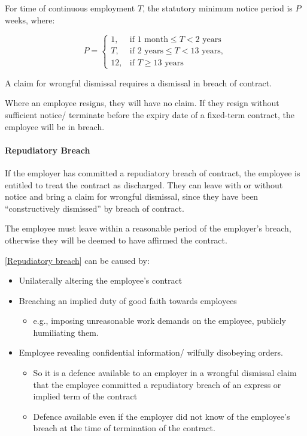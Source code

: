 \documentclass[
]{article}
\providecommand{\tightlist}{%
  \setlength{\itemsep}{0pt}\setlength{\parskip}{0pt}}
\begin{document}
For time of continuous employment \(T\), the statutory minimum notice
period is \(P\) weeks, where:

\[P = \begin{cases}  
1 , & \text{if } 1 \text{ month} \leq T < 2 \text{ years}\\  
T , & \text{if } 2 \text{ years} \leq T < 13 \text{ years},\\  
12, & \text{if } T \geq 13 \text{ years}  
\end{cases}  
\]

A claim for wrongful dismissal requires a dismissal in breach of
contract.

Where an employee resigns, they will have no claim. If they resign
without sufficient notice/ terminate before the expiry date of a
fixed-term contract, the employee will be in breach.

\hypertarget{repudiatory-breach}{%
\paragraph{Repudiatory Breach}\label{repudiatory-breach}}

If the employer has committed a repudiatory breach of contract, the
employee is entitled to treat the contract as discharged. They can leave
with or without notice and bring a claim for wrongful dismissal, since
they have been ``constructively dismissed'' by breach of contract.

The employee must leave within a reasonable period of the employer's
breach, otherwise they will be deemed to have affirmed the contract.

{[}\protect\hyperlink{repudiatory-breach}{Repudiatory breach}{]} can be
caused by:

\begin{itemize}
\tightlist
\item
  Unilaterally altering the employee's contract
\item
  Breaching an implied duty of good faith towards employees

  \begin{itemize}
  \tightlist
  \item
    e.g., imposing unreasonable work demands on the employee, publicly
    humiliating them.
  \end{itemize}
\item
  Employee revealing confidential information/ wilfully disobeying
  orders.

  \begin{itemize}
  \tightlist
  \item
    So it is a defence available to an employer in a wrongful dismissal
    claim that the employee committed a repudiatory breach of an express
    or implied term of the contract
  \item
    Defence available even if the employer did not know of the
    employee's breach at the time of termination of the contract.
  \end{itemize}
\end{itemize}
\end{document}
